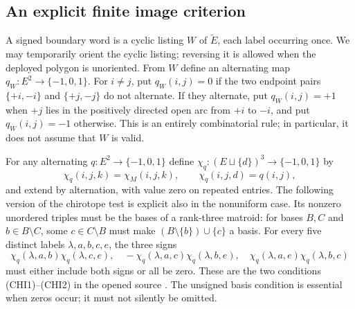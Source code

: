 \documentclass[11pt,a4paper]{article}
\begin{document}
\subsection{An explicit finite image criterion}

A signed boundary word is a cyclic listing $W$ of $\widetilde E$, each
label occurring once.  We may temporarily orient the cyclic listing;
reversing it is allowed when the deployed polygon is unoriented.  From
$W$ define an alternating map $q_W:E^2\longrightarrow\{-1,0,1\}$.
For $i\ne j$, put $q_W(i,j)=0$ if the two endpoint pairs
$\{+i,-i\}$ and $\{+j,-j\}$ do not alternate.  If they alternate, put
$q_W(i,j)=+1$ when $+j$ lies in the positively directed open arc from
$+i$ to $-i$, and put $q_W(i,j)=-1$ otherwise.  This is an entirely
combinatorial rule; in particular, it does not assume that $W$ is valid.

For any alternating $q:E^2\longrightarrow\{-1,0,1\}$ define
$\chi_q:(E\sqcup\{d\})^3\longrightarrow\{-1,0,1\}$ by
\begin{equation}
 \chi_q(i,j,k)=\chi_M(i,j,k),\qquad
 \chi_q(i,j,d)=q(i,j),                                      \label{eq:P-combined}
\end{equation}
and extend by alternation, with value zero on repeated entries.  The
following version of the chirotope test is explicit also in the
nonuniform case.  Its nonzero unordered triples must be the bases of a
rank-three matroid: for bases $B,C$ and $b\in B\setminus C$, some
$c\in C\setminus B$ must make $(B\setminus\{b\})\cup\{c\}$ a basis.
For every five distinct labels $\lambda,a,b,c,e$, the three signs
\begin{equation}
 \chi_q(\lambda,a,b)\chi_q(\lambda,c,e),\quad
 -\chi_q(\lambda,a,c)\chi_q(\lambda,b,e),\quad
 \chi_q(\lambda,a,e)\chi_q(\lambda,b,c)                    \label{eq:P-GP}
\end{equation}
must either include both signs or all be zero.  These are the two
conditions (CHI1)--(CHI2) in the opened source
\cite[\S7.2.3, p.~10]{RGZpreprint}.  The unsigned basis condition is
essential when zeros occur; it must not silently be omitted.
\end{document}
